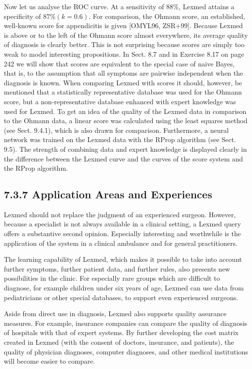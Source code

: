 \documentclass[10pt]{book}
\begin{document}
\begin{center}
\begin{enumerate}
Now let us analyse the ROC curve. At a sensitivity of $88 \%$, Lexmed attains a specificity of $87 \%(k=0.6)$. For comparison, the Ohmann score, an established, well-known score for appendicitis is given [OMYL96, ZSR+99]. Because Lexmed is above or to the left of the Ohmann score almost everywhere, its average quality of diagnosis is clearly better. This is not surprising because scores are simply too weak to model interesting propositions. In Sect. 8.7 and in Exercise 8.17 on page 242 we will show that scores are equivalent to the special case of naive Bayes, that is, to the assumption that all symptoms are pairwise independent when the diagnosis is known. When comparing Lexmed with scores it should, however, be mentioned that a statistically representative database was used for the Ohmann score, but a non-representative database enhanced with expert knowledge was used for Lexmed. To get an idea of the quality of the Lexmed data in comparison to the Ohmann data, a linear score was calculated using the least squares method (see Sect. 9.4.1), which is also drawn for comparison. Furthermore, a neural network was trained on the Lexmed data with the RProp algorithm (see Sect. 9.5). The strength of combining data and expert knowledge is displayed clearly in the difference between the Lexmed curve and the curves of the score system and the RProp algorithm.

\subsection*{7.3.7 Application Areas and Experiences}
Lexmed should not replace the judgment of an experienced surgeon. However, because a specialist is not always available in a clinical setting, a Lexmed query offers a substantive second opinion. Especially interesting and worthwhile is the application of the system in a clinical ambulance and for general practitioners.

The learning capability of Lexmed, which makes it possible to take into account further symptoms, further patient data, and further rules, also presents new possibilities in the clinic. For especially rare groups which are difficult to diagnose, for example children under six years of age, Lexmed can use data from pediatricians or other special databases, to support even experienced surgeons.

Aside from direct use in diagnosis, Lexmed also supports quality assurance measures. For example, insurance companies can compare the quality of diagnosis of hospitals with that of expert systems. By further developing the cost matrix created in Lexmed (with the consent of doctors, insurance, and patients), the quality of physician diagnoses, computer diagnoses, and other medical institutions will become easier to compare.


\end{enumerate}
\end{center}
\end{document}
